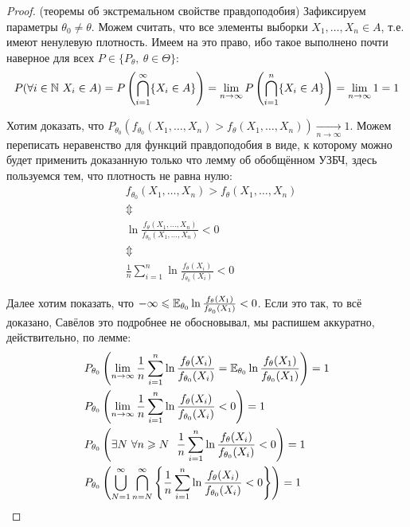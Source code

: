 \begin{proof} (теоремы об экстремальном свойстве правдоподобия)
    Зафиксируем параметры $\theta_0 \neq \theta$. Можем считать, что все элементы выборки $X_1, \dots, X_n \in A$, т.е. имеют ненулевую плотность. Имеем на это право, ибо такое выполнено почти наверное для всех $P \in \{P_\theta,\ \theta \in \Theta\}$:
    \[
        P(\forall i \in \mathbb{N} \ X_i \in A) = P\left(\bigcap_{i=1}^\infty \{X_i \in A\}\right) = \lim_{n \to \infty} P\left(\bigcap_{i=1}^n \{X_i \in A\}\right) = \lim_{n \to \infty} 1 = 1
    \]
    
    Хотим доказать, что $P_{\theta_0}(f_{\theta_0}(X_1, \dots, X_n) > f_\theta(X_1, \dots, X_n)) \xrightarrow[n \to \infty]{} 1$. Можем переписать неравенство для функций правдоподобия в виде, к которому можно будет применить доказанную только что лемму об обобщённом УЗБЧ, здесь пользуемся тем, что плотность не равна нулю:
    \begin{align*}
        & f_{\theta_0}(X_1, \dots, X_n) > f_\theta(X_1, \dots, X_n)
        \\
        & \Updownarrow
        \\
        & \ln \frac{f_\theta(X_1, \dots, X_n)}{f_{\theta_0}(X_1, \dots, X_n)} < 0
        \\
        & \Updownarrow
        \\
        & \frac{1}{n} \sum_{i=1}^n \ln \frac{f_\theta(X_i)}{f_{\theta_0}(X_i)} < 0
    \end{align*}

    Далее хотим показать, что $-\infty \leqslant \mathbb{E}_{\theta_0} \ln \frac{f_\theta(X_1)}{f_{\theta_0}(X_1)} < 0$. Если это так, то всё доказано, Савёлов это подробнее не обосновывал, мы распишем аккуратно, действительно, по лемме:
    \begin{align*}
        & P_{\theta_0}\ps{\lim_{n \to \infty} \frac{1}{n} \sum_{i=1}^n \ln \frac{f_\theta(X_i)}{f_{\theta_0}(X_i)} = \E_{\theta_0} \ln \frac{f_\theta(X_1)}{f_{\theta_0}(X_1)}} = 1
        \\
        & P_{\theta_0}\ps{\lim_{n \to \infty} \frac{1}{n} \sum_{i=1}^n \ln \frac{f_\theta(X_i)}{f_{\theta_0}(X_i)} < 0} = 1
        \\
        & P_{\theta_0}\ps{\exists N \ \forall n \ge N \ \ \frac{1}{n} \sum_{i=1}^n \ln \frac{f_\theta(X_i)}{f_{\theta_0}(X_i)} < 0} = 1
        \\
        & P_{\theta_0}\ps{\bigcup_{N=1}^\infty \bigcap_{n=N}^\infty \set{\frac{1}{n} \sum_{i=1}^n \ln \frac{f_\theta(X_i)}{f_{\theta_0}(X_i)} < 0}} = 1
    \end{align*}


\end{proof}
